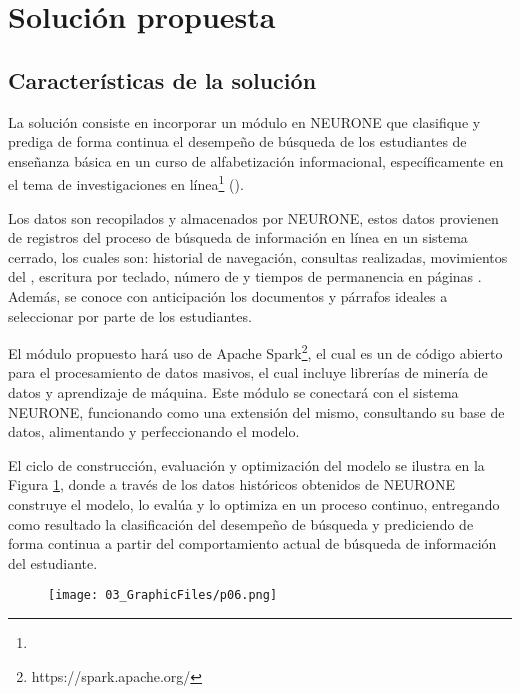 \section{Solución propuesta}
\label{sec:solucion_propuesta}

\subsection{Características de la solución}
\label{subsec:caracteristicas-solucion}
La solución consiste en incorporar un módulo en NEURONE \parencite{gonzalez2017neurone} que clasifique y prediga de forma continua el desempeño de búsqueda de los estudiantes de enseñanza básica en un curso de alfabetización informacional, específicamente en el tema de investigaciones en línea\footnote{\traduccionlibre} (). 

Los datos son recopilados y almacenados por NEURONE, estos datos provienen de registros del proceso de búsqueda de información en línea en un sistema cerrado, los cuales son: historial de navegación, consultas realizadas, movimientos del , escritura por teclado, número de  y tiempos de permanencia en páginas . Además, se conoce con anticipación los documentos y párrafos ideales a seleccionar por parte de los estudiantes.

El módulo propuesto hará uso de Apache Spark\footnote{https://spark.apache.org/}, el cual es un  de código abierto para el procesamiento de datos masivos, el cual incluye librerías de minería de datos y aprendizaje de máquina. Este módulo se conectará con el sistema NEURONE, funcionando como una extensión del mismo, consultando su base de datos, alimentando y perfeccionando el modelo. 

El ciclo de construcción, evaluación y optimización del modelo se ilustra en la Figura \ref{fig:ml-pipeline}, donde a través de los datos históricos obtenidos de NEURONE construye el modelo, lo evalúa y lo optimiza en un proceso continuo, entregando como resultado la clasificación del desempeño de búsqueda y prediciendo de forma continua a partir del comportamiento actual de búsqueda de información del estudiante.

\begin{figure}[H]
	\centering
	\texttt{[image: 03\_GraphicFiles/p06.png]}
	\label{fig:ml-pipeline}
\end{figure}


